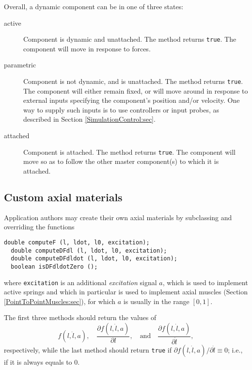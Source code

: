 Overall, a dynamic component can be in one of three states:

\begin{description}

\item[active]\mbox{}

Component is dynamic and unattached. The method
returns {\tt true}. The component will move in response to forces.

\item[parametric]\mbox{}

Component is not dynamic, and is unattached. 
The method
returns {\tt true}.
The component will either remain
fixed, or will move around in response to external inputs specifying
the component's position and/or velocity. One way to supply such
inputs is to use controllers or input probes, as described in
Section \ref{SimulationControl:sec}.

\item[attached]\mbox{}

Component is attached. The method
returns {\tt true}. The component will move so as to follow the other
master component(s) to which it is attached.

\end{description}

\subsection{Custom axial materials}
\label{CustomAxialMaterials:sec}

Application authors may create their
own axial materials by subclassing 
and overriding the functions
\begin{lstlisting}[]
  double computeF (l, ldot, l0, excitation);
  double computeDFdl (l, ldot, l0, excitation);
  double computeDFdldot (l, ldot, l0, excitation);
  boolean isDFdldotZero ();
\end{lstlisting}
%
where {\tt excitation} is an additional {\it excitation} signal $a$, which
is used to implement active springs and which in particular is used to
implement axial muscles (Section \ref{PointToPointMuscles:sec}), for
which $a$ is usually in the range $[0, 1]$.

The first three methods should return the values of 
%
\begin{equation}
f (l, \dot l, a), \quad
\frac{\partial f(l, \dot l, a)}{\partial l}, \quad \text{and} \quad
\frac{\partial f(l, \dot l, a)}{\partial \dot l},
\end{equation}
%
respectively, while the last method should return {\tt true} if
$\partial f(l, \dot l, a) / \partial \dot l \equiv 0$; i.e., if it is
always equals to 0.


